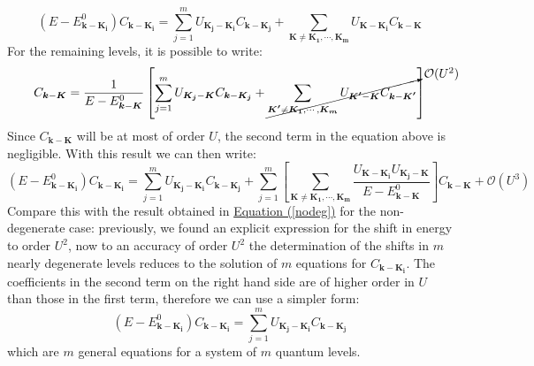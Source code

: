 \documentclass[10.75pt,a4paper,openright,bottom=2cm]{article}
\renewcommand{\Vec}[1]{\boldsymbol{#1}}
\renewcommand{\refeq}[1]{\hyperref[#1]{Equation (\ref{#1})}}
\begin{document}
\[
(E-E^0_{\Vec{k}-\Vec{K_i}})C_{\Vec{k}-\Vec{K_i}}=\sum_{j=1}^mU_{\Vec{K_j}-\Vec{K_i}}C_{\Vec{k}-\Vec{K_j}}+\sum_{\Vec{K}\neq\Vec{K_1},\cdots,\Vec{K_m}}U_{\Vec{K}-\Vec{K_i}}C_{\Vec{k}-\Vec{K}}
\]
For the remaining levels, it is possible to write:
\[
C_{\Vec{k}-\Vec{K}}=\frac{1}{E-E^0_{\Vec{k}-\Vec{K}}}\left[\sum_{j=1}^mU_{\Vec{K_j}-\Vec{K}}C_{\Vec{k}-\Vec{K_j}}+\cancelto{\mathcal{O}(U^2)}{\sum_{\Vec{K'}\neq\Vec{K_1},\cdots,\Vec{K_m}}U_{\Vec{K'}-\Vec{K}}C_{\Vec{k}-\Vec{K'}}}\right]
\]
Since $C_{\Vec{k}-\Vec{K}}$ will be at most of order $U$, the second term in the equation above is negligible. With this result we can then write:
\[
(E-E^0_{\Vec{k}-\Vec{K_i}})C_{\Vec{k}-\Vec{K_i}}=\sum_{j=1}^mU_{\Vec{K_j}-\Vec{K_i}}C_{\Vec{k}-\Vec{K_j}}+\sum_{j=1}^m\left[\sum_{\Vec{K}\neq\Vec{K_1},\cdots,\Vec{K_m}}\frac{U_{\Vec{K}-\Vec{K_i}}U_{\Vec{K_j}-\Vec{K}}}{E-E^0_{\Vec{k}-\Vec{K}}}\right]C_{\Vec{k}-\Vec{K}}+\mathcal{O}(U^3)
\]
Compare this with the result obtained in \refeq{nodeg} for the non-degenerate case: previously, we found an explicit expression for the shift in energy to order $U^2$, now to an accuracy of order $U^2$ the determination of the shifts in $m$ nearly degenerate levels reduces to the solution of $m$ equations for $C_{\Vec{k}-\Vec{K_i}}$. The coefficients in the second term on the right hand side are of higher order in $U$ than those in the first term, therefore we can use a simpler form:
\[
(E-E^0_{\Vec{k}-\Vec{K_i}})C_{\Vec{k}-\Vec{K_i}}=\sum_{j=1}^mU_{\Vec{K_j}-\Vec{K_i}}C_{\Vec{k}-\Vec{K_j}}
\]
which are $m$ general equations for a system of $m$ quantum levels. 
\end{document}
